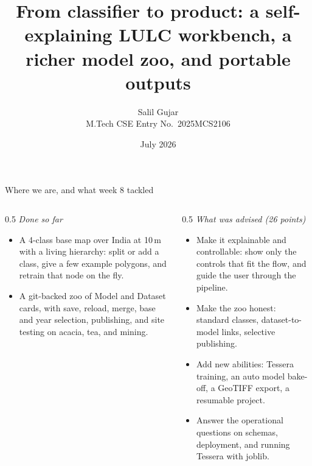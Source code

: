 \documentclass[aspectratio=169]{beamer}
\title[Self-explaining LULC workbench]{From classifier to product: a self-explaining LULC workbench, a richer model zoo, and portable outputs}
\author[Salil Gujar]{Salil Gujar \\ \footnotesize M.Tech CSE \quad Entry No.\ 2025MCS2106}
\date{July 2026}
\begin{document}
\frame{\titlepage}

\begin{frame}{Where we are, and what week 8 tackled}
\begin{columns}[T]
\begin{column}{0.5\textwidth}
\emph{Done so far}
\begin{itemize}\small
  \item A 4-class base map over India at 10\,m with a living hierarchy: split or add a class, give a
  few example polygons, and retrain that node on the fly.
  \item A git-backed zoo of Model and Dataset cards, with save, reload, merge, base and year
  selection, publishing, and site testing on acacia, tea, and mining.
\end{itemize}
\end{column}
\begin{column}{0.5\textwidth}
\emph{What was advised (26 points)}
\begin{itemize}\small
  \item Make it explainable and controllable: show only the controls that fit the flow, and guide the
  user through the pipeline.
  \item Make the zoo honest: standard classes, dataset-to-model links, selective publishing.
  \item Add new abilities: Tessera training, an auto model bake-off, a GeoTIFF export, a resumable
  project.
  \item Answer the operational questions on schemas, deployment, and running Tessera with joblib.
\end{itemize}
\end{column}
\end{columns}
\end{frame}
\end{document}
